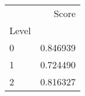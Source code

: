 \begin{tabular}{lr}
\toprule
{} &     Score \\
Level &           \\
\midrule
0     &  0.846939 \\
1     &  0.724490 \\
2     &  0.816327 \\
\bottomrule
\end{tabular}
